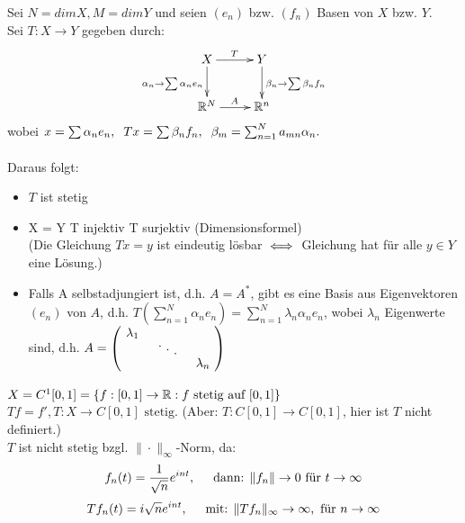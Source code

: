 Sei $N = dim X, M = dim Y$ und seien $(e_n)$ bzw. $(f_n)$ Basen von $X$ bzw. $Y$. 	\\
Sei $T : X \rightarrow Y$ gegeben durch: \\
\[ \begin{xy} \xymatrix{
	X \ar[r]^T	\ar[d]_{ \alpha_{n} \rightarrow \sum \alpha_{n} e_{n} }  &   Y \ar[d]^{ \beta_{n} \rightarrow \sum \beta_{n} f_{n} }  \\
      	\MdR^{N} 	\ar[r]^A    				&   \MdR^{n}  				
} \end{xy} \]
wobei $x = \sum \alpha_{n} e_{n},\hspace{0.2cm} Tx = \sum \beta_n f_n, \hspace{0.2cm} \beta_m = \sum_{n = 1}^{N} a_{mn} \alpha_{n}. $ \\ \\
Daraus folgt:
\begin{itemize}
	\item $T$ ist stetig
	\item X = Y \gdw T injektiv \gdw T surjektiv (Dimensionsformel) \\
	(Die Gleichung $Tx = y$ ist eindeutig lösbar $\iff$ Gleichung hat für alle $y \in Y$ eine Lösung.)
	\item Falls A selbstadjungiert ist, d.h. $A = A^{*}$, gibt es eine Basis aus Eigenvektoren $(e_{n})$ von $A$, d.h. $ T( \sum_{n=1}^{N} \alpha_{n} e_{n} ) = \sum_{n=1}^{N} \lambda_{n} \alpha_{n} e_{n}$, wobei $\lambda_{n}$ Eigenwerte sind, d.h. $A =
			\begin{pmatrix}
				\diagentry{\lambda_{1}}\\
				&\diagentry{\xddots}\\
				&&\diagentry{\lambda_{n}}\\
			\end{pmatrix} $
\end{itemize}

\begin{beispiel}
$X = C^{1}[0, 1] = \{ f : [0, 1] \rightarrow \mathbb{R}: f \text{ stetig auf } [0, 1] \}$ \\
$T f = f', T : X \rightarrow C[0, 1] \text{ stetig.} $ (Aber: $T: C[0, 1] \rightarrow C[0, 1]$, hier ist $T$ nicht definiert.) \\

$T$ ist nicht stetig bzgl. $\| \cdot \|_{\infty}$-Norm, da:
\[ f_{n}(t) = \frac{1}{\sqrt{n}}e^{int}, \hspace{0.5cm}  \text{dann: } \|f_{n}\| \rightarrow 0 \text{ für } t \rightarrow \infty \]	
\[ T f_{n}(t) = i \sqrt{n} e^{int}, \hspace{0.5cm} \text{mit: } \| T f_{n} \|_{\infty} \rightarrow \infty, \text{ für } n \rightarrow \infty \]
\end{beispiel}

